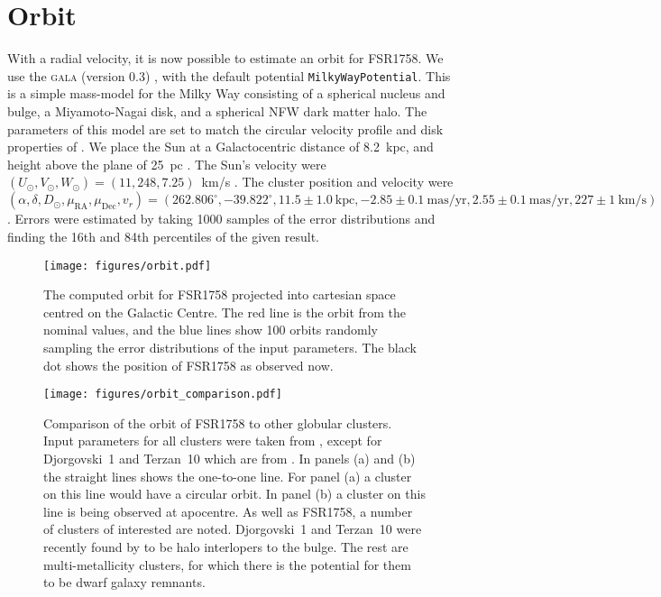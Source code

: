 \documentclass[fleqn,usenatbib,letters]{mnras}
\begin{document}
\section{Orbit}

With a radial velocity, it is now possible to estimate an orbit for FSR1758. We use the \textsc{gala} (version 0.3) \citep{M.Price-Whelan2017,Price-Whelan2018b}, with the default potential \texttt{MilkyWayPotential}. This is a simple mass-model for the Milky Way consisting of a spherical nucleus and bulge, a Miyamoto-Nagai disk, and a spherical NFW dark matter halo. The parameters of this model are set to match the circular velocity profile and disk properties of \citet{Bovy:2015gg}. We place the Sun at a Galactocentric distance of 8.2~kpc, and height above the plane of 25~pc \citep{BlandHawthorn:2016iq, Bland-hawthorn2018}. The Sun's velocity were $(U_\odot,V_\odot,W_\odot)=(11,248,7.25)$~km/s \citep{Schonrich2012}. The cluster position and velocity were $(\alpha,\delta,D_\odot,\mu_\mathrm{RA},\mu_\mathrm{Dec},v_r)=(262.806^\circ,-39.822^\circ,11.5\pm1.0~\mathrm{kpc},-2.85\pm0.1~\mathrm{mas/yr},2.55\pm0.1~\mathrm{mas/yr},227\pm1~\mathrm{km/s})$. Errors were estimated by taking 1000 samples of the error distributions and finding the 16th and 84th percentiles of the given result.

\begin{figure*}
	\texttt{[image: figures/orbit.pdf]}
    \caption{The computed orbit for FSR1758 projected into cartesian space centred on the Galactic Centre. The red line is the orbit from the nominal values, and the blue lines show 100 orbits randomly sampling the error distributions of the input parameters. The black dot shows the position of FSR1758 as observed now.}
    \label{fig:orbit}
\end{figure*}

\begin{figure*}
	\texttt{[image: figures/orbit\_comparison.pdf]}
    \caption{Comparison of the orbit of FSR1758 to other globular clusters. Input parameters for all clusters were taken from \citet{Vasiliev:2018uf}, except for Djorgovski~1 and Terzan~10 which are from \citet{Ortolani2019}. In panels (a) and (b) the straight lines shows the one-to-one line. For panel (a) a cluster on this line would have a circular orbit. In panel (b) a cluster on this line is being observed at apocentre. As well as FSR1758, a number of clusters of interested are noted. Djorgovski~1 and Terzan~10 were recently found by \citet{Ortolani2019} to be halo interlopers to the bulge. The rest are multi-metallicity clusters, for which there is the potential for them to be dwarf galaxy remnants.}
    \label{fig:orbit_comparison.pdf}
\end{figure*}
\end{document}
